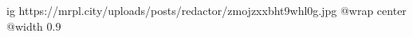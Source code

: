  
 
 
 
 

\ifcmt
  ig https://mrpl.city/uploads/posts/redactor/zmojzxxbht9whl0g.jpg
  @wrap center
  @width 0.9
\fi
